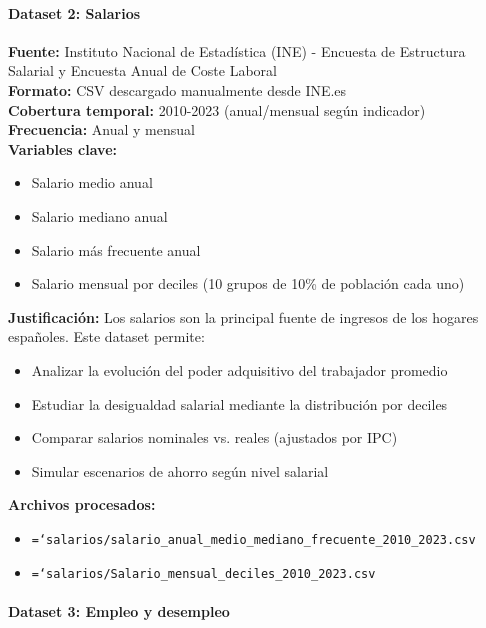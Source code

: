 \documentclass{article}
\let\oldtexttt\texttt  %
\renewcommand{\texttt}[1]{{\footnotesize\oldtexttt{\hyphenchar\font=`\-#1}}}  %
\begin{document}
\paragraph{Dataset 2: Salarios}

\textbf{Fuente:} Instituto Nacional de Estad\'istica (INE) - Encuesta de Estructura Salarial y Encuesta Anual de Coste Laboral\\
\textbf{Formato:} CSV descargado manualmente desde INE.es\\
\textbf{Cobertura temporal:} 2010-2023 (anual/mensual seg\'un indicador)\\
\textbf{Frecuencia:} Anual y mensual\\
\textbf{Variables clave:}
\begin{itemize}
    \item Salario medio anual
    \item Salario mediano anual
    \item Salario m\'as frecuente anual
    \item Salario mensual por deciles (10 grupos de 10\% de poblaci\'on cada uno)
\end{itemize}

\textbf{Justificaci\'on:} Los salarios son la principal fuente de ingresos de los hogares espa\~noles. Este dataset permite:
\begin{itemize}
    \item Analizar la evoluci\'on del poder adquisitivo del trabajador promedio
    \item Estudiar la desigualdad salarial mediante la distribuci\'on por deciles
    \item Comparar salarios nominales vs. reales (ajustados por IPC)
    \item Simular escenarios de ahorro seg\'un nivel salarial
\end{itemize}

\textbf{Archivos procesados:}
\begin{itemize}
    \item \texttt{salarios/salario\_anual\_medio\_mediano\_frecuente\_2010\_2023.csv}
    \item \texttt{salarios/Salario\_mensual\_deciles\_2010\_2023.csv}
\end{itemize}

\paragraph{Dataset 3: Empleo y desempleo}
\end{document}
